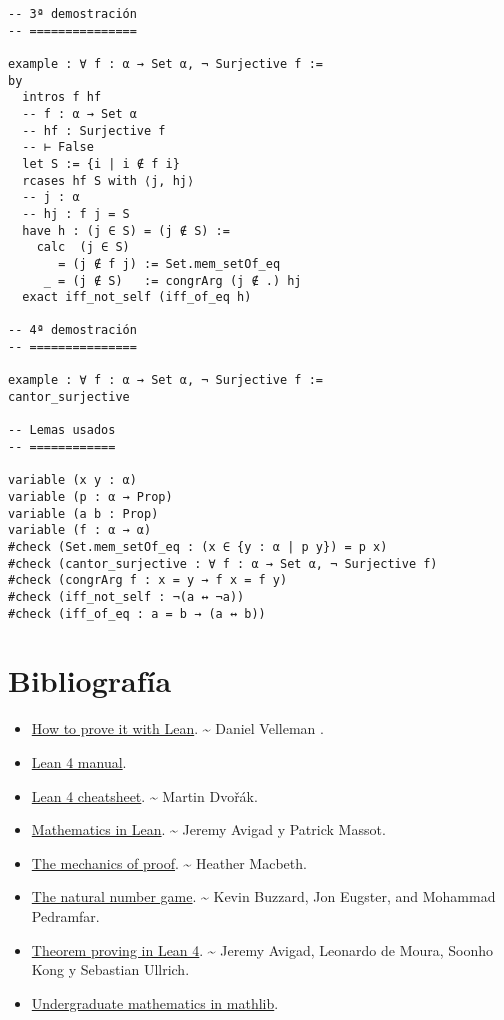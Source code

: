 \begin{verbatim}
-- 3ª demostración
-- ===============

example : ∀ f : α → Set α, ¬ Surjective f :=
by
  intros f hf
  -- f : α → Set α
  -- hf : Surjective f
  -- ⊢ False
  let S := {i | i ∉ f i}
  rcases hf S with ⟨j, hj⟩
  -- j : α
  -- hj : f j = S
  have h : (j ∈ S) = (j ∉ S) :=
    calc  (j ∈ S)
       = (j ∉ f j) := Set.mem_setOf_eq
     _ = (j ∉ S)   := congrArg (j ∉ .) hj
  exact iff_not_self (iff_of_eq h)

-- 4ª demostración
-- ===============

example : ∀ f : α → Set α, ¬ Surjective f :=
cantor_surjective

-- Lemas usados
-- ============

variable (x y : α)
variable (p : α → Prop)
variable (a b : Prop)
variable (f : α → α)
#check (Set.mem_setOf_eq : (x ∈ {y : α | p y}) = p x)
#check (cantor_surjective : ∀ f : α → Set α, ¬ Surjective f)
#check (congrArg f : x = y → f x = f y)
#check (iff_not_self : ¬(a ↔ ¬a))
#check (iff_of_eq : a = b → (a ↔ b))
\end{verbatim}

\chapter{Bibliografía}
\label{sec:org56f6922}

\begin{itemize}
\item \href{https://djvelleman.github.io/HTPIwL/}{How to prove it with Lean}. \textasciitilde{} Daniel Velleman .
\item \href{https://leanprover.github.io/lean4/doc/whatIsLean.html}{Lean 4 manual}.
\item \href{https://leanprover-community.github.io/papers/lean-tactics.pdf}{Lean 4 cheatsheet}. \textasciitilde{} Martin Dvořák.
\item \href{https://leanprover-community.github.io/mathematics\_in\_lean/mathematics\_in\_lean.pdf}{Mathematics in Lean}. \textasciitilde{} Jeremy Avigad y Patrick Massot.
\item \href{https://hrmacbeth.github.io/math2001/}{The mechanics of proof}. \textasciitilde{} Heather Macbeth.
\item \href{https://adam.math.hhu.de/\#/g/hhu-adam/NNG4}{The natural number game}. \textasciitilde{} Kevin Buzzard, Jon Eugster, and Mohammad Pedramfar.
\item \href{https://leanprover.github.io/theorem\_proving\_in\_lean4/title\_page.html}{Theorem proving in Lean 4}. \textasciitilde{} Jeremy Avigad, Leonardo de Moura, Soonho Kong y Sebastian Ullrich.
\item \href{https://leanprover-community.github.io/undergrad.html}{Undergraduate mathematics in mathlib}.
\end{itemize}



